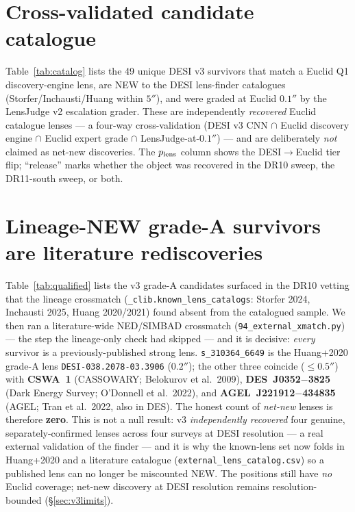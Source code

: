 \appendix

\section{Cross-validated candidate catalogue}
\label{sec:catalog}
Table~\ref{tab:catalog} lists the 49 unique DESI v3 survivors that match a Euclid Q1
discovery-engine lens, are NEW to the DESI lens-finder catalogues (Storfer/Inchausti/Huang within
$5''$), and were graded at Euclid $0.1''$ by the LensJudge v2 escalation grader. These are
independently \emph{recovered} Euclid catalogue lenses --- a four-way cross-validation (DESI v3 CNN
$\cap$ Euclid discovery engine $\cap$ Euclid expert grade $\cap$ LensJudge-at-$0.1''$) --- and are
deliberately \emph{not} claimed as net-new discoveries. The $p_{\rm lens}$ column shows the
DESI$\to$Euclid tier flip; ``release'' marks whether the object was recovered in the DR10 sweep,
the DR11-south sweep, or both.



\section{Lineage-NEW grade-A survivors are literature rediscoveries}
\label{sec:qualified}
Table~\ref{tab:qualified} lists the v3 grade-A candidates surfaced in the DR10 vetting that the
lineage crossmatch (\texttt{\_clib.known\_lens\_catalogs}: Storfer 2024, Inchausti 2025, Huang
2020/2021) found absent from the catalogued sample. We then ran a literature-wide NED/SIMBAD
crossmatch (\texttt{94\_external\_xmatch.py}) --- the step the lineage-only check had skipped --- and
it is decisive: \emph{every} survivor is a previously-published strong lens. \texttt{s\_310364\_6649}
is the Huang+2020 grade-A lens \texttt{DESI-038.2078-03.3906} ($0.2''$); the other three coincide
($\le0.5''$) with \textbf{CSWA~1} (CASSOWARY; Belokurov et al.\ 2009), \textbf{DES~J0352$-$3825}
(Dark Energy Survey; O'Donnell et al.\ 2022), and \textbf{AGEL~J221912$-$434835} (AGEL; Tran et al.\
2022, also in DES). The honest count of \emph{net-new} lenses is therefore \textbf{zero}. This is
not a null result: v3 \emph{independently recovered} four genuine, separately-confirmed lenses
across four surveys at DESI resolution --- a real external validation of the finder --- and it is
why the known-lens set now folds in Huang+2020 and a literature catalogue
(\texttt{external\_lens\_catalog.csv}) so a published lens can no longer be miscounted NEW. The
positions still have \emph{no} Euclid coverage; net-new discovery at DESI resolution remains
resolution-bounded (\S\ref{sec:v3limits}).

